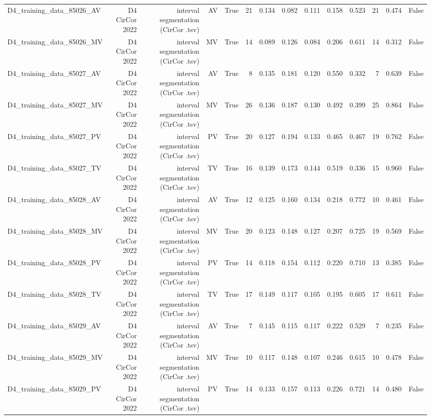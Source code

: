 \begin{table}[htbp]
\begin{tabular}{lrrrrrrrrrrrrr}
    D4\_training\_data\_85026\_AV & D4 CirCor 2022 & interval segmentation (CirCor .tsv) & AV & True & 21 & 0.134 & 0.082 & 0.111 & 0.158 & 0.523 & 21 & 0.474 & False \\
    D4\_training\_data\_85026\_MV & D4 CirCor 2022 & interval segmentation (CirCor .tsv) & MV & True & 14 & 0.089 & 0.126 & 0.084 & 0.206 & 0.611 & 14 & 0.312 & False \\
    D4\_training\_data\_85027\_AV & D4 CirCor 2022 & interval segmentation (CirCor .tsv) & AV & True & 8 & 0.135 & 0.181 & 0.120 & 0.550 & 0.332 & 7 & 0.639 & False \\
    D4\_training\_data\_85027\_MV & D4 CirCor 2022 & interval segmentation (CirCor .tsv) & MV & True & 26 & 0.136 & 0.187 & 0.130 & 0.492 & 0.399 & 25 & 0.864 & False \\
    D4\_training\_data\_85027\_PV & D4 CirCor 2022 & interval segmentation (CirCor .tsv) & PV & True & 20 & 0.127 & 0.194 & 0.133 & 0.465 & 0.467 & 19 & 0.762 & False \\
    D4\_training\_data\_85027\_TV & D4 CirCor 2022 & interval segmentation (CirCor .tsv) & TV & True & 16 & 0.139 & 0.173 & 0.144 & 0.519 & 0.336 & 15 & 0.960 & False \\
    D4\_training\_data\_85028\_AV & D4 CirCor 2022 & interval segmentation (CirCor .tsv) & AV & True & 12 & 0.125 & 0.160 & 0.134 & 0.218 & 0.772 & 10 & 0.461 & False \\
    D4\_training\_data\_85028\_MV & D4 CirCor 2022 & interval segmentation (CirCor .tsv) & MV & True & 20 & 0.123 & 0.148 & 0.127 & 0.207 & 0.725 & 19 & 0.569 & False \\
    D4\_training\_data\_85028\_PV & D4 CirCor 2022 & interval segmentation (CirCor .tsv) & PV & True & 14 & 0.118 & 0.154 & 0.112 & 0.220 & 0.710 & 13 & 0.385 & False \\
    D4\_training\_data\_85028\_TV & D4 CirCor 2022 & interval segmentation (CirCor .tsv) & TV & True & 17 & 0.149 & 0.117 & 0.105 & 0.195 & 0.605 & 17 & 0.611 & False \\
    D4\_training\_data\_85029\_AV & D4 CirCor 2022 & interval segmentation (CirCor .tsv) & AV & True & 7 & 0.145 & 0.115 & 0.117 & 0.222 & 0.529 & 7 & 0.235 & False \\
    D4\_training\_data\_85029\_MV & D4 CirCor 2022 & interval segmentation (CirCor .tsv) & MV & True & 10 & 0.117 & 0.148 & 0.107 & 0.246 & 0.615 & 10 & 0.478 & False \\
    D4\_training\_data\_85029\_PV & D4 CirCor 2022 & interval segmentation (CirCor .tsv) & PV & True & 14 & 0.133 & 0.157 & 0.113 & 0.226 & 0.721 & 14 & 0.480 & False \\

\end{tabular}
\end{table}
